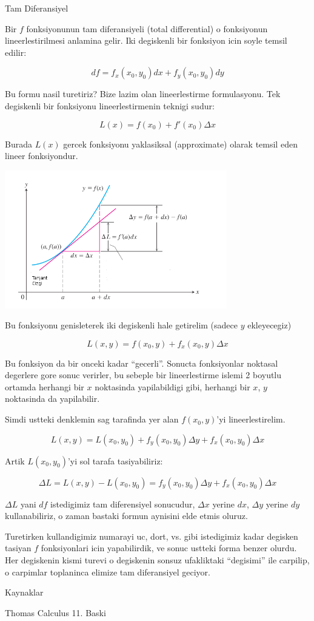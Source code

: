 \documentclass[12pt,fleqn]{article}
\begin{document}
Tam Diferansiyel

Bir $f$ fonksiyonunun tam diferansiyeli (total differential) o
fonksiyonun lineerlestirilmesi anlamina gelir. Iki degiskenli bir
fonksiyon icin soyle temsil edilir:

\[ df = f_x(x_0, y_0)dx + f_y(x_0,y_0)dy  \]

Bu formu nasil turetiriz? Bize lazim olan lineerlestirme formulasyonu. Tek
degiskenli bir fonksiyonu lineerlestirmenin teknigi sudur:

\[ L(x) = f(x_0) + f'(x_0) \Delta x  \]

Burada $L(x)$ gercek fonksiyonu yaklasiksal (approximate) olarak temsil eden
lineer fonksiyondur. 

\includegraphics[height=6cm]{linearization.png}

Bu fonksiyonu genisleterek iki degiskenli hale getirelim (sadece $y$
ekleyecegiz)

\[ L(x,y) = f(x_0,y) + f_x(x_0,y) \Delta x \]

Bu fonksiyon da bir onceki kadar ``gecerli''. Sonucta fonksiyonlar
noktasal degerlere gore sonuc verirler, bu sebeple bir lineerlestirme
islemi 2 boyutlu ortamda herhangi bir $x$ noktasinda yapilabildigi
gibi, herhangi bir $x$, $y$ noktasinda da yapilabilir.

Simdi ustteki denklemin sag tarafinda yer alan $f(x_0,y)$'yi lineerlestirelim.  

\[ L(x,y) = L(x_0,y_0) + f_y(x_0,y_0) \Delta y + f_x(x_0,y_0) \Delta x \]

Artik $L(x_0,y_0)$'yi sol tarafa tasiyabiliriz:

\[ \Delta L = L(x,y) - L(x_0,y_0) = f_y(x_0,y_0) \Delta y + f_x(x_0,y_0) \Delta x \]

$\Delta L$ yani $df$ istedigimiz tam diferensiyel sonucudur, $\Delta
x$ yerine $dx$, $\Delta y$ yerine $dy$ kullanabiliriz, o zaman bastaki
formun aynisini elde etmis oluruz.

Turetirken kullandigimiz numarayi uc, dort, vs. gibi istedigimiz kadar
degisken tasiyan $f$ fonksiyonlari icin yapabilirdik, ve sonuc ustteki
forma benzer olurdu. Her degiskenin kismi turevi o degiskenin sonsuz
ufakliktaki ``degisimi'' ile carpilip, o carpimlar toplaninca elimize
tam diferansiyel geciyor.

Kaynaklar

Thomas Calculus 11. Baski
\end{document}
